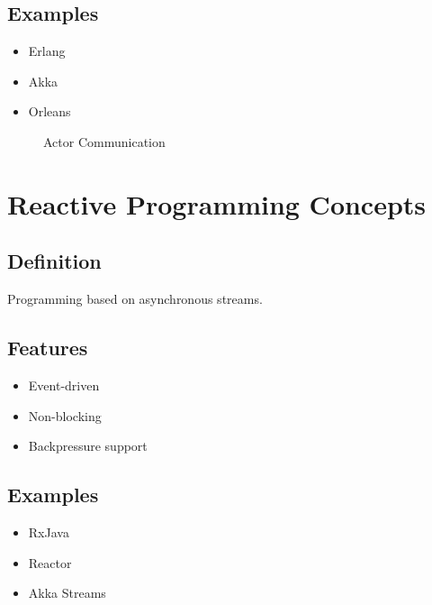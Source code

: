 \subsection{Examples}

\begin{itemize}
\item Erlang
\item Akka
\item Orleans
\end{itemize}

\begin{figure}[h]
\centering
{}
\caption{Actor Communication}
\end{figure}

\section{Reactive Programming Concepts}

\subsection{Definition}

Programming based on asynchronous streams.

\subsection{Features}

\begin{itemize}
\item Event-driven
\item Non-blocking
\item Backpressure support
\end{itemize}

\subsection{Examples}

\begin{itemize}
\item RxJava
\item Reactor
\item Akka Streams
\end{itemize}

